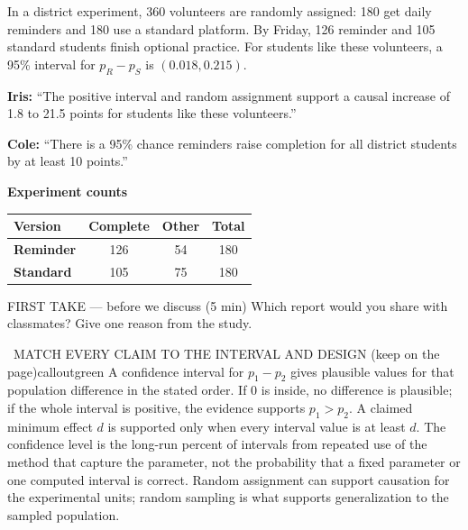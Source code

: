\documentclass[11pt]{article}
\begin{document}


In a district experiment, 360 volunteers are randomly assigned: 180 get daily reminders and 180 use a standard platform. By Friday, 126 reminder and 105 standard students finish optional practice. For students like these volunteers, a 95\% interval for $p_R-p_S$ is $(0.018,0.215)$.\par\smallskip \textbf{Iris:} ``The positive interval and random assignment support a causal increase of 1.8 to 21.5 points for students like these volunteers.''\par \textbf{Cole:} ``There is a 95\% chance reminders raise completion for all district students by at least 10 points.''\par
\begin{center}
\textbf{Experiment counts}\par\smallskip
\begin{tabular}{|l|c|c|c|}
\hline
\textbf{Version} & \textbf{Complete} & \textbf{Other} & \textbf{Total} \\ \hline
\textbf{Reminder} & 126 & 54 & 180 \\ \hline
\textbf{Standard} & 105 & 75 & 180 \\ \hline
\end{tabular}
\end{center}
\begin{firsttakebox}{FIRST TAKE --- before we discuss (5 min)}
Which report would you share with classmates? Give one reason from the study.
\workspace{0.9in}
\end{firsttakebox}

\begin{callout}{\IconBook\ MATCH EVERY CLAIM TO THE INTERVAL AND DESIGN (keep on the page)}{calloutgreen}
A confidence interval for $p_1-p_2$ gives plausible values for that population difference in the stated order.
If 0 is inside, no difference is plausible; if the whole interval is positive, the evidence supports $p_1>p_2$.
A claimed minimum effect $d$ is supported only when every interval value is at least $d$.
The confidence level is the long-run percent of intervals from repeated use of the method that capture the parameter,
not the probability that a fixed parameter or one computed interval is correct. Random assignment can support causation
for the experimental units; random sampling is what supports generalization to the sampled population.
\end{callout}
\end{document}
